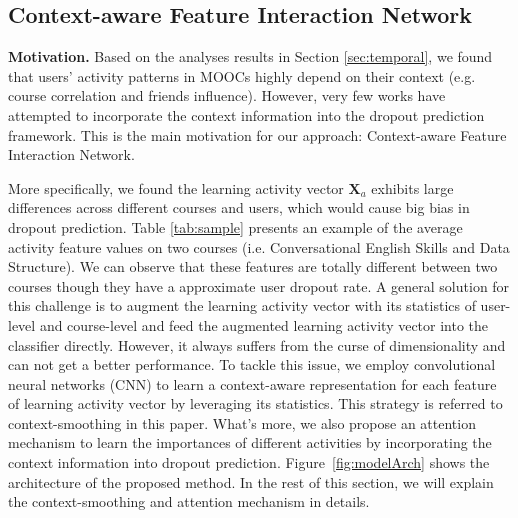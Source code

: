 \subsection{Context-aware Feature Interaction Network}
\textbf{Motivation.} Based on the analyses results in Section \ref{sec:temporal}, we found that users' activity patterns in MOOCs highly depend on their context (e.g. course correlation and friends influence). However,  very few works have attempted to incorporate the context information into the dropout prediction framework.
 This is the main motivation for our approach: Context-aware Feature Interaction Network. 
 
 More specifically, we found the learning activity vector $\textbf{X}_a$ exhibits large differences across different courses and users, which would cause big bias in dropout prediction. Table \ref{tab:sample} presents an example of the average activity feature values on two courses (i.e. Conversational English Skills and Data Structure). We can observe that these features are totally different between two courses though they have a approximate user dropout rate. A general solution for this challenge is to augment the learning activity vector with its statistics of user-level and course-level and feed the augmented learning activity vector into the classifier directly. However, it always suffers from the curse of dimensionality and can not get a better performance. To tackle this issue, we employ convolutional neural networks (CNN) to learn a context-aware representation for each feature of learning activity vector by leveraging its statistics. This strategy is referred to context-smoothing in this paper. What's more, we also propose an attention mechanism to learn the importances of different activities by incorporating the context information into dropout prediction. Figure~\ref{fig:modelArch} shows the architecture of the proposed method.
 In the rest of this section, we will explain the context-smoothing and attention mechanism in details.

